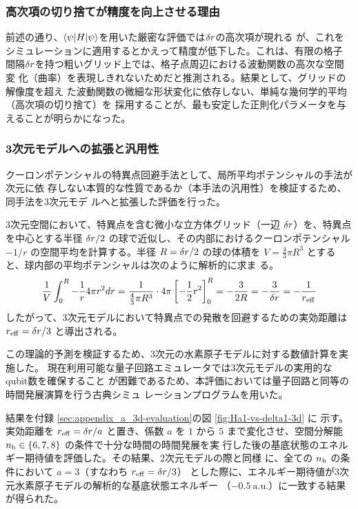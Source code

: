 \documentclass[wabun2025.tex]{subfiles}
\begin{document}
\subsubsection{高次項の切り捨てが精度を向上させる理由}
前述の通り、$\braket{\psi|H|\psi}$を用いた厳密な評価では$\delta r$の高次項が現れる
が、これをシミュレーションに適用するとかえって精度が低下した。これは、有限の格子
間隔$\delta r$を持つ粗いグリッド上では、格子点周辺における波動関数の高次な空間変
化（曲率）を表現しきれないためだと推測される。結果として、グリッドの解像度を超え
た波動関数の微細な形状変化に依存しない、単純な幾何学的平均（高次項の切り捨て）を
採用することが、最も安定した正則化パラメータを与えることが明らかになった。

\subsubsection{3次元モデルへの拡張と汎用性}
\label{subsec:discussion-3d-extension}

クーロンポテンシャルの特異点回避手法として、局所平均ポテンシャルの手法が次元に依
存しない本質的な性質であるか（本手法の汎用性）を検証するため、同手法を3次元モデ
ルへと拡張した評価を行った。

3次元空間において、特異点を含む微小な立方体グリッド（一辺 $\delta r$）を、特異点
を中心とする半径 $\delta r/2$ の球で近似し、その内部におけるクーロンポテンシャル
$-1/r$ の空間平均を計算する。半径 $R = \delta r/2$ の球の体積を $V =
\frac{4}{3}\pi R^3$ とすると、球内部の平均ポテンシャルは次のように解析的に求ま
る。
\begin{equation}
    \frac{1}{V} \int_{0}^{R} -\frac{1}{r} 4\pi r^2 dr 
    = \frac{1}{\frac{4}{3}\pi R^3} \cdot 4\pi
      \left[ -\frac{1}{2}r^2 \right]_{0}^{R} 
    = -\frac{3}{2R} = -\frac{3}{\delta r}=-\frac{1}{r_{\mathrm{eff}}}
\end{equation}
したがって、3次元モデルにおいて特異点での発散を回避するための実効距離は $r_{\mathrm{eff}} =
\delta r/3$ と導出される。

この理論的予測を検証するため、3次元の水素原子モデルに対する数値計算を実施した。
現在利用可能な量子回路エミュレータでは3次元モデルの実用的なqubit数を確保すること
が困難であるため、本評価においては量子回路と同等の時間発展演算を行う古典シミュ
レーションプログラムを用いた。

結果を付録 \ref{sec:appendix_a_3d-evaluation}の図 \ref{fig:Ha1-vs-delta1-3d} に
示す。実効距離を $r_{\mathrm{eff}} = \delta r/a$ と置き、係数 $a$ を $1$ から $5$
まで変化させ、空間分解能 $n_{\mathrm{b}} \in \{6, 7, 8\}$ の条件で十分な時間の時間発展を実
行した後の基底状態のエネルギー期待値を評価した。その結果、2次元モデルの際と同様
に、全ての $n_{\mathrm{b}}$ の条件において $a=3$（すなわち $r_{\mathrm{eff}} = \delta r/3$）
とした際に、エネルギー期待値が3次元水素原子モデルの解析的な基底状態エネルギー
（$-0.5\ \mathrm{a.u.}$）に一致する結果が得られた。
\end{document}
